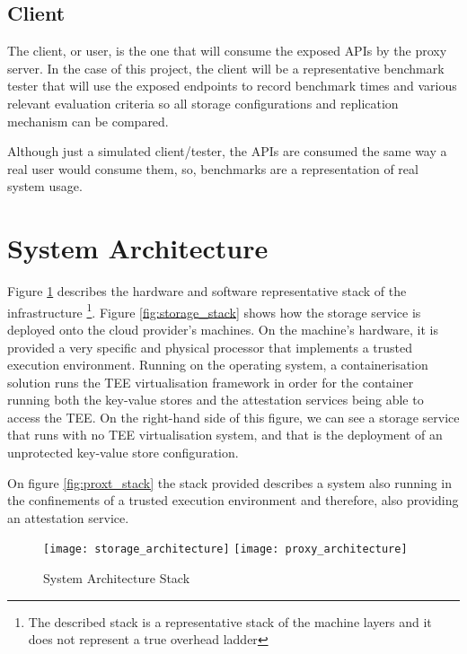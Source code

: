 \subsection{Client}
\label{ssec:client}

The client, or user, is the one that will consume the exposed \glspl{API} by the proxy server. In the case of this project, the client will be a representative benchmark tester that will use the exposed endpoints to record benchmark times and various relevant evaluation criteria so all storage configurations and replication mechanism can be compared.

Although just a simulated client/tester, the \glspl{API} are consumed the same way a real user would consume them, so, benchmarks are a representation of real system usage.

\section{System Architecture}
\label{sec:system_architecture}

Figure \ref{fig:system_architecture_stack} describes the hardware and software representative stack of the infrastructure \footnote{The described stack is a representative stack of the machine layers and it does not represent a true overhead ladder}. Figure \ref{fig:storage_stack} shows how the storage service is deployed onto the cloud provider's machines. On the machine’s hardware, it is provided a very specific and physical processor that implements a trusted execution environment. Running on the operating system, a containerisation solution runs the \gls{TEE} virtualisation framework in order for the container running both the key-value stores and the attestation services being able to access the \gls{TEE}. On the right-hand side of this figure, we can see a storage service that runs with no \gls{TEE} virtualisation system, and that is the deployment of an unprotected key-value store configuration.

On figure \ref{fig:proxt_stack} the stack provided describes a system also running in the confinements of a trusted execution environment and therefore, also providing an attestation service.

\begin{figure}[htbp]
  \centering
    {\texttt{[image: storage\_architecture]}}%
    \hspace{5em}
    {\texttt{[image: proxy\_architecture]}}%
  \caption{System Architecture Stack}
  \label{fig:system_architecture_stack}
\end{figure}

